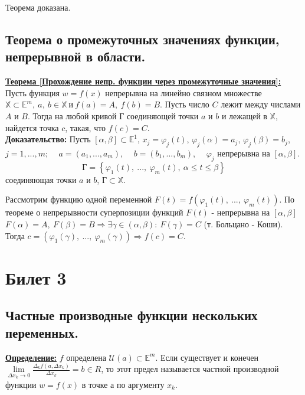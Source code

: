 \documentclass[a4paper,12pt]{article} %
\renewcommand {\leq}{\leqslant}
\begin{document}
	Теорема доказана.
	
	\subsection{Теорема о промежуточных значениях функции, непрерывной в области.}
	
	\underline{\textbf{Теорема [Прохождение непр. функции через промежуточные значения]:}}\\
	
	Пусть функция $w = f(x)$ непрерывна на линейно связном множестве $\mathbb{X} \subset \mathbb{E}^m, ~ a, ~ b \in \mathbb{X} ~ и ~ f(a) = A, ~ f(b) = B$. Пусть число $C$ лежит между числами $A$ и $B$. Тогда на любой кривой $Г$ соединяющей точки $a$ и $b$ и лежащей в $\mathbb{X}$, найдется точка $c$, такая, что $f(c) = C$.\\
	
	\textbf{Доказательство:} Пусть $[\alpha, \beta] \subset \mathbb{E}^1$, $x_j = \varphi_j(t)$, $\varphi_j(\alpha) = a_j$, $\varphi_j(\beta) = b_j$, $j = 1, ..., m$;
	$\quad a = (a_1, ..., a_m)$, $\quad b = (b_1, ..., b_m)$, $\quad \varphi_j$ непрерывна на $[\alpha, \beta]$.
	\[\text{Г} = \left\{\varphi_1(t),~ ..., ~\varphi_m(t), ~\alpha \leq t \leq \beta \right\}\] соединяющая точки $a$ и $b$, $\text{Г} \subset \mathbb{X}$.
	
	Рассмотрим функцию одной переменной $F(t) = f(\varphi_1(t),~ ..., ~\varphi_m(t))$. По теореме о непрерывности суперпозиции функций $F(t)$ - непрерывна на $[\alpha, \beta]$
	$F(\alpha) = A, ~ F(\beta) = B \Rightarrow \exists \gamma \in (\alpha, \beta): ~ F(\gamma) = C$ (т. Больцано - Коши). 
	Тогда $c = (\varphi_1(\gamma),~ ..., ~\varphi_m(\gamma)) \Rightarrow f(c) = C.$
	
	
	\newpage
	\section{Билет 3}
	
	\subsection{Частные производные функции нескольких переменных.}  
	
	\underline{\textbf{Определение:}} $f$ определена $\mathscr{U}(a) \subset \mathds{E}^m$. Если существует и конечен $\lim\limits_{\Delta{x_k}\to 0} \frac{\Delta_k f(a, \Delta{x_k})}{\Delta{x_k}}=b \in R$, то этот предел называется частной производной функции $w = f(x)$ в точке а по аргументу $x_k$.\\
	
\end{document}
